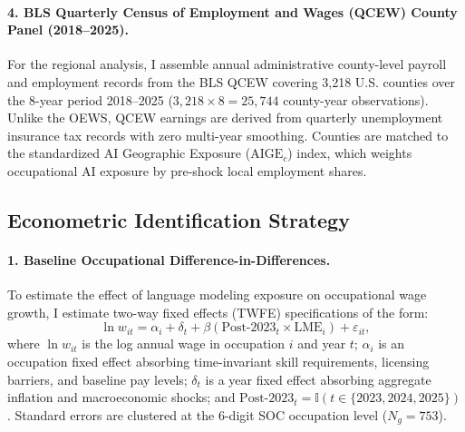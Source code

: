\documentclass[12pt]{article}
\begin{document}
\paragraph{4. BLS Quarterly Census of Employment and Wages (QCEW) County Panel (2018--2025).}
For the regional analysis, I assemble annual administrative county-level payroll and employment records from the BLS QCEW covering 3,218 U.S. counties over the 8-year period 2018--2025 ($3,218 \times 8 = 25,744$ county-year observations). Unlike the OEWS, QCEW earnings are derived from quarterly unemployment insurance tax records with zero multi-year smoothing. Counties are matched to the standardized \citet{felten2021} AI Geographic Exposure ($\text{AIGE}_c$) index, which weights occupational AI exposure by pre-shock local employment shares.

\subsection{Econometric Identification Strategy}

\paragraph{1. Baseline Occupational Difference-in-Differences.}
To estimate the effect of language modeling exposure on occupational wage growth, I estimate two-way fixed effects (TWFE) specifications of the form:
\begin{equation}
\label{eq:did_occ}
\ln w_{it} = \alpha_i + \delta_t + \beta \left( \text{Post-2023}_t \times \text{LME}_i \right) + \varepsilon_{it},
\end{equation}
where $\ln w_{it}$ is the log annual wage in occupation $i$ and year $t$; $\alpha_i$ is an occupation fixed effect absorbing time-invariant skill requirements, licensing barriers, and baseline pay levels; $\delta_t$ is a year fixed effect absorbing aggregate inflation and macroeconomic shocks; and $\text{Post-2023}_t = \mathbb{I}(t \in \{2023, 2024, 2025\})$. Standard errors are clustered at the 6-digit SOC occupation level ($N_g = 753$).
\end{document}
